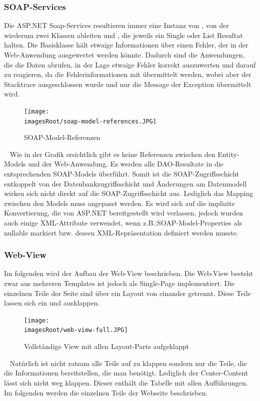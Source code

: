 \documentclass[11pt, a4paper, twoside]{article}   	%
\newcommand{\imagesRoot}{images}
\begin{document}
\subsubsection{SOAP-Services}
Die ASP.NET Soap-Services resultieren immer eine Instanz von , von der wiederum zwei Klassen ableiten  und , die jeweils ein Single oder List Resultat halten. Die Basisklasse hält etwaige Informationen über einen Fehler, der in der Web-Anwendung ausgewertet werden könnte. Dadurch sind die Anwendungen, die die Daten abrufen, in der Lage etwaige Fehler korrekt auszuwerten und darauf zu reagieren, da die Fehlerinformationen mit übermittelt werden, wobei aber der Stacktrace ausgeschlossen wurde und nur die Message der Exception übermittelt wird.
\begin{figure}[h]
	\centering
	\texttt{[image: \\imagesRoot/soap-model-references.JPG]}
	\caption
	{SOAP-Model-Referenzen}
\end{figure}
\ \newline
Wie in der Grafik ersichtlich gibt es keine Referenzen zwischen den Entity-Models und der Web-Anwendung. Es werden alle DAO-Resultate in die entsprechenden SOAP-Models überführt. Somit ist die SOAP-Zugriffsschicht entkoppelt von der Datenbankzugriffsschicht und Änderungen am Datenmodell wirken sich nicht direkt auf die SOAP-Zugriffsschicht aus. Lediglich das Mapping zwischen den Models muss angepasst werden.
\newline
\newline
Es wird sich auf die implizite Konvertierung, die von ASP.NET bereitgestellt wird verlassen, jedoch wurden auch einige XML-Attribute verwendet, wenn z.B.:SOAP-Model-Properties als nullable markiert bzw. dessen XML-Repräsentation definiert werden musste. 
\newpage
\subsubsection{Web-View}
Im folgenden wird der Aufbau der Web-View beschrieben. Die Web-View besteht zwar aus mehreren Templates ist jedoch als Single-Page implementiert. Die einzelnen Teile der Seite sind über ein Layout von einander getrennt. Diese Teile lassen sich ein und ausklappen.
\begin{figure}[h]
	\centering
	\texttt{[image: \\imagesRoot/web-view-full.JPG]}
	\caption
	{Vollständige View mit allen Layout-Parts aufgeklappt}
\end{figure}
\ \newpage
Natürlich ist nicht ratsam alle Teile auf zu klappen sondern nur die Teile, die die Informationen bereitstellen, die man benötigt. Lediglich der Center-Content lässt sich nicht weg klappen. Dieser enthält die Tabelle mit allen Aufführungen. Im folgenden werden die einzelnen Teile der Webseite beschrieben.
\end{document}
